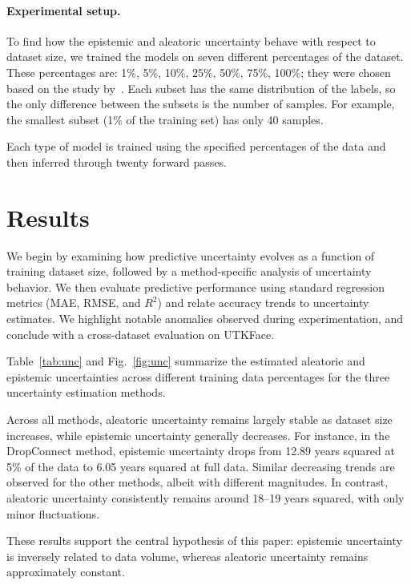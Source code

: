 \documentclass[runningheads]{llncs}
\begin{document}
\paragraph{Experimental setup.}
To find how the epistemic and aleatoric uncertainty behave with respect to dataset size, we trained the models on seven different percentages of the dataset. These percentages are: 1\%, 5\%, 10\%, 25\%, 50\%, 75\%, 100\%; they were chosen based on the study by~\cite{dejong2025measuring}. Each subset has the same distribution of the labels, so the only difference between the subsets is the number of samples. For example, the smallest subset (1\% of the training set) has only 40 samples.

Each type of model is trained using the specified percentages of the data and then inferred through twenty forward passes.

\section{Results}
\label{sec:results}

We begin by examining how predictive uncertainty evolves as a function of training dataset size, followed by a method-specific analysis of uncertainty behavior. We then evaluate predictive performance using standard regression metrics (MAE, RMSE, and $R^2$) and relate accuracy trends to uncertainty estimates. We highlight notable anomalies observed during experimentation, and conclude with a cross-dataset evaluation on UTKFace.

Table~\ref{tab:unc} and Fig.~\ref{fig:unc} summarize the estimated aleatoric and epistemic uncertainties across different training data percentages for the three uncertainty estimation methods.

Across all methods, aleatoric uncertainty remains largely stable as dataset size increases, while epistemic uncertainty generally decreases. For instance, in the DropConnect method, epistemic uncertainty drops from 12.89 years squared at 5\% of the data to 6.05 years squared at full data. Similar decreasing trends are observed for the other methods, albeit with different magnitudes. In contrast, aleatoric uncertainty consistently remains around 18--19 years squared, with only minor fluctuations.

These results support the central hypothesis of this paper: epistemic uncertainty is inversely related to data volume, whereas aleatoric uncertainty remains approximately constant.
\end{document}

